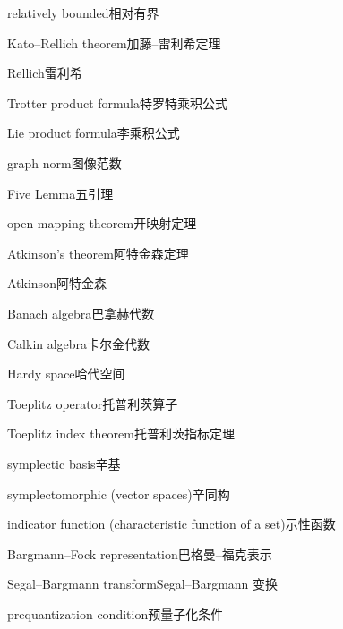 \begin{multicols}{2}
relatively bounded\hspace{0.9em}相对有界\par
Kato–Rellich theorem\hspace{0.9em}加藤–雷利希定理\par
Rellich\hspace{0.9em}雷利希\par
Trotter product formula\hspace{0.9em}特罗特乘积公式\par
Lie product formula\hspace{0.9em}李乘积公式\par
graph norm\hspace{0.9em}图像范数\par
Five Lemma\hspace{0.9em}五引理\par
open mapping theorem\hspace{0.9em}开映射定理\par
Atkinson's theorem\hspace{0.9em}阿特金森定理\par
Atkinson\hspace{0.9em}阿特金森\par
Banach algebra\hspace{0.9em}巴拿赫代数\par
Calkin algebra\hspace{0.9em}卡尔金代数\par
Hardy space\hspace{0.9em}哈代空间\par
Toeplitz operator\hspace{0.9em}托普利茨算子\par
Toeplitz index theorem\hspace{0.9em}托普利茨指标定理\par
symplectic basis\hspace{0.9em}辛基\par
symplectomorphic (vector spaces)\hspace{0.9em}辛同构\par
indicator function (characteristic function of a set)\hspace{0.9em}示性函数\par
Bargmann–Fock representation\hspace{0.9em}巴格曼–福克表示\par
Segal–Bargmann transform\hspace{0.9em}Segal–Bargmann 变换\par
prequantization condition\hspace{0.9em}预量子化条件\par

\end{multicols}
